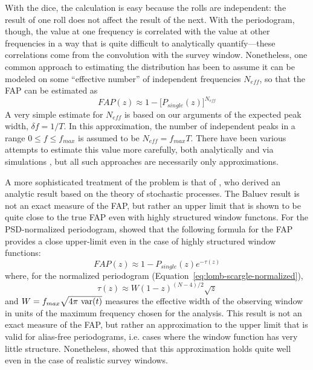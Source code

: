 \documentclass[preprint]{aastex}
\newcommand{\Eq}[1]{Equation~\ref{eq:#1}}
\newcommand{\eq}[1]{\Eq{#1}}
\newcommand{\eqlabel}[1]{\label{eq:#1}}
\begin{document}
With the dice, the calculation is easy because the rolls are independent: the
result of one roll does not affect the result of the next.
With the periodogram, though, the value at one frequency is correlated with
the value at other frequencies in a way that is quite difficult to analytically
quantify---these correlations come from the convolution with the survey
window.
Nonetheless, one common approach to estimating the distribution has been to
assume it can be modeled on some ``effective number'' of independent
frequencies $N_{eff}$, so that the FAP can be estimated as
\begin{equation}
  FAP(z) \approx 1 - \big[P_{single}(z)\big]^{N_{eff}}
  \eqlabel{FAP-neff}
\end{equation}
A very simple estimate for $N_{eff}$ is based on our arguments of the
expected peak width, $\delta f = 1/T$.
In this approximation, the number of independent peaks in a range
$0 \le f \le f_{max}$ is assumed to be $N_{eff} = f_{max} T$.
There have been various attempts to estimate this value more carefully,
both analytically and via simulations
\citep[see, e.g.][]{Horne86,Schwarzenberg-Czerny98,Cumming04,Frescura08},
but all such approaches are necessarily only approximations.


A more sophisticated treatment of the problem is that of \citet{Baluev2008},
who derived an analytic result based on the theory of stochastic processes.
The Baluev result is not an exact measure of the FAP, but rather an upper
limit that is shown to be quite close to the true FAP even
with highly structured window functons.
For the PSD-normalized periodogram, \citet{Baluev2008} showed that the following
formula for the FAP provides a close upper-limit even in the case of
highly structured window functions:
\begin{equation}
  FAP(z) \approx 1 - P_{single}(z)e^{-\tau(z)}
  \eqlabel{FAP-baluev}
\end{equation}
where, for the normalized periodogram (\eq{lomb-scargle-normalized}),
\begin{equation}
  \tau(z) \approx W (1 - z)^{(N - 4)/2}\sqrt{z}
\end{equation}
and $W = f_{max} \sqrt{4\pi\ {\rm var}(t)}$ measures the effective width of the
observing window in units of the maximum frequency chosen for the analysis.
This result is not an exact measure of the FAP, but rather an approximation
to the upper limit that is valid for alias-free periodograms, {i.e.} cases
where the window function has very little structure.
Nonetheless, \citet{Baluev2008} showed that this approximation holds quite well
even in the case of realistic survey windows.
\end{document}
